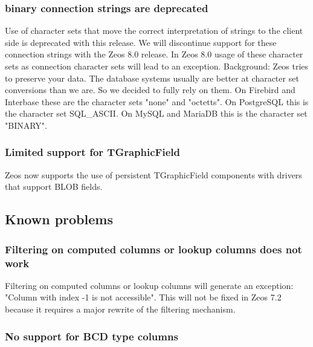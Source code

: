 \documentclass[a4paper,12pt,oneside]{book}
\begin{document}
\subsubsection{binary connection strings are deprecated}
\label{sec:Rev6_General_Changes_BinaryConnectonStringsDeprecated}

Use of character sets that move the correct interpretation of strings to the client side is deprecated with this release.
We will discontinue support for these connection strings with the Zeos 8.0 release.
In Zeos 8.0 usage of these character sets as connection character sets will lead to an exception.
Background:
Zeos tries to preserve your data.
The database systems usually are better at character set conversions than we are.
So we decided to fully rely on them.
On Firebird and Interbase these are the character sets "none" and "octetts".
On PostgreSQL this is the character set SQL\_ASCII.
On MySQL and MariaDB this is the character set "BINARY".

\subsubsection{Limited support for TGraphicField}
\label{sec:Rev6_General_Changes_TGrapgicField}

Zeos now supports the use of persistent TGraphicField components with drivers that support BLOB fields.

\subsection{Known problems}
\label{sec:Rev6_General_KnownProblems}

\subsubsection{Filtering on computed columns or lookup columns does not work}
\label{sec:Rev6_General_KnownProblems_FilteringComputeColumnsLookupColumns}

Filtering on computed columns or lookup columns will generate an exception: "Column with index -1 is not accessible".
This will not be fixed in Zeos 7.2 because it requires a major rewrite of the filtering mechanism.

\subsubsection{No support for BCD type columns}
\label{sec:Rev6_General_KnownProblems_BCD}
\end{document}
